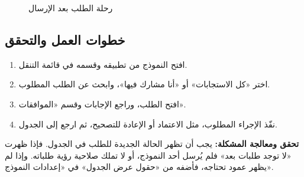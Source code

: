 \begin{figure}[H]
\centering
{}
\rclegend
\caption{رحلة الطلب بعد الإرسال}
\label{fig:builder-forms-submissions-flow}
\end{figure}

\subsection{خطوات العمل والتحقق}
\begin{enumerate}
\item افتح النموذج من تطبيقه وقسمه في قائمة التنقل.
\item اختر «كل الاستجابات» أو «أنا مشارك فيها»، وابحث عن الطلب المطلوب.
\item افتح الطلب، وراجع الإجابات وقسم «الموافقات».
\item نفّذ الإجراء المطلوب، مثل الاعتماد أو الإعادة للتصحيح، ثم ارجع إلى الجدول.
\end{enumerate}

\textbf{تحقق ومعالجة المشكلة:} يجب أن تظهر الحالة الجديدة للطلب في الجدول. فإذا ظهرت «لا توجد طلبات بعد» فلم يُرسل أحد النموذج، أو لا تملك صلاحية رؤية طلباته. وإذا لم يظهر عمود تحتاجه، فأضفه من «حقول عرض الجدول» في «إعدادات النموذج».
